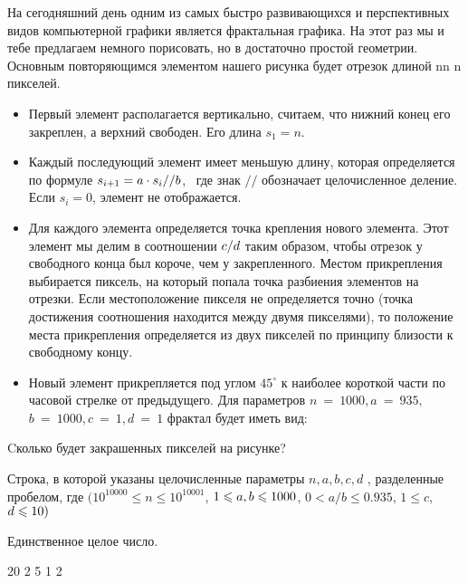 
На сегодняшний день одним из самых быстро развивающихся и перспективных видов компьютерной графики является фрактальная графика. 
На этот раз мы и тебе предлагаем немного порисовать, но в достаточно простой геометрии. Основным повторяющимся элементом нашего 
рисунка будет отрезок длиной nn n  пикселей. 
\begin{itemize}
    \item Первый элемент располагается вертикально, считаем, что нижний конец его закреплен, 
    а верхний свободен. Его длина $s_1 = n$. 
    \item Каждый последующий элемент имеет меньшую длину, которая определяется по формуле 
    $s_{i+1}=a \cdot s_i \space // \space b$,  где знак $//$ обозначает целочисленное деление. Если $s_i = 0$, элемент не отображается.
    \item Для каждого элемента определяется точка крепления нового элемента. Этот элемент мы 
    делим в соотношении $c \space / \space d$ таким образом, чтобы отрезок у свободного конца был короче, чем у закрепленного. 
    Местом прикрепления выбирается пиксель, на который попала точка разбиения элементов на отрезки. Если 
    местоположение пикселя не определяется точно (точка достижения соотношения находится между двумя пикселями), 
    то положение места прикрепления определяется из двух пикселей по принципу близости к свободному концу.
    \item Новый элемент прикрепляется под углом $45^{\circ}$ к наиболее короткой части по часовой стрелке от 
    предыдущего. Для параметров $n~=~1000, a~=~935,$ \linebreak $b~=~1000, c~=~1, d~=~1$  фрактал будет иметь вид:
\end{itemize}


Cколько будет закрашенных пикселей на рисунке?


Строка, в которой указаны целочисленные параметры $n, a, b, c, d$ , разделенные пробелом, где 
$(10^{10000} \leq n \leq 10^{10001}$, $1 \leq a,\space b \leq 1000$, $0 < a/b \leq  0.935$, 
$1 \leq c$, $\space d \leq 10 )$

\outputfmtSection

Единственное целое число.


\begin{myverbbox}[\small]{\vinput}
    20 2 5 1 2
\end{myverbbox}

